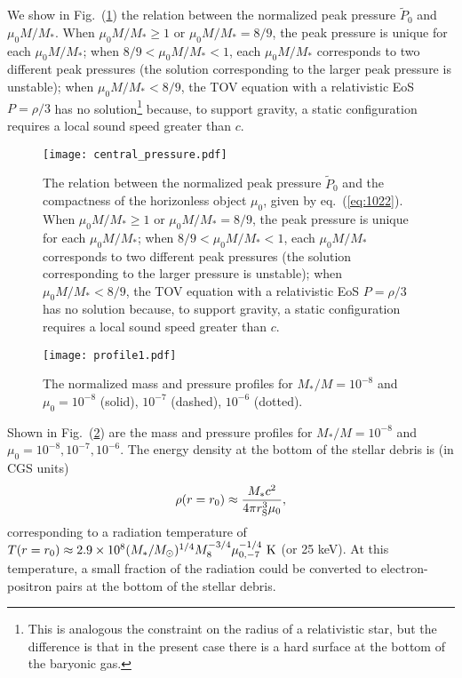 \documentclass[useAMS,usenatbib]{mn2e}
\def\tp{\widetilde{P}}
\begin{document}
We show in Fig.~(\ref{fig:p0}) the relation between the normalized
peak pressure $\tp_0$ and $\mu_0 M/M_*$. When $\mu_0 M/M_* \geq 1$
or $\mu_0 M/M_*=8/9$, the peak pressure is unique for each $\mu_0
M/M_*$; when $8/9<\mu_0 M/M_*<1$, each $\mu_0 M/M_*$
corresponds to two different peak pressures (the solution
corresponding to the larger peak pressure is unstable); when $\mu_0
M/M_*<8/9$, the TOV equation with a relativistic EoS $P = \rho/3$ has no
solution\footnote{This is analogous the \citet{Buchdahl59} constraint on the radius
  of a relativistic star, but the difference
  is that in the present case there is a hard surface at the bottom of the
  baryonic gas.} because, to support gravity, a static configuration
requires a local sound speed greater than $c$.

\begin{figure}
  \centering
\texttt{[image: central\_pressure.pdf]}
\caption{The relation between the normalized peak pressure
  $\tp_0$ and the compactness of the horizonless object $\mu_0$, given
  by eq.~(\ref{eq:1022}). When $\mu_0 M/M_* \geq 1$
or $\mu_0 M/M_*=8/9$, the peak pressure is unique for each $\mu_0
M/M_*$; when $8/9<\mu_0 M/M_*<1$, each $\mu_0 M/M_*$
corresponds to two different peak pressures (the solution
corresponding to the larger pressure is unstable); when $\mu_0
M/M_*<8/9$, the TOV equation with a relativistic EoS $P = \rho/3$ has no
solution because, to support gravity, a static configuration
requires a local sound speed greater than $c$.
}\label{fig:p0}
\end{figure}

\begin{figure}
  \centering
\texttt{[image: profile1.pdf]}
\caption{The normalized mass and pressure profiles for $M_*/M =
  10^{-8}$ and $\mu_0 = 10^{-8}$ (solid), $10^{-7}$
  (dashed), $10^{-6}$ (dotted).
}\label{fig:profile1}
\end{figure}

Shown in Fig.~(\ref{fig:profile1}) are the mass and pressure profiles
for $M_*/M = 10^{-8}$ and $\mu_0 = 10^{-8}, 10^{-7},
10^{-6}$. The energy density at the
bottom of the stellar debris is (in CGS units)
\begin{equation}
  \label{eq:12}
  \rho(r = r_0) \approx \frac{M_*c^2}{4\pi r_{\rm S}^3\mu_0},
\end{equation}
corresponding to a radiation temperature of $T(r = r_0) \approx
2.9\times10^8 (M_*/M_{\rm \odot})^{1/4} M_8^{-3/4}
\mu_{0,-7}^{-1/4}\rm\ K$ (or 25 keV). At this temperature,
a small fraction of the radiation could be converted to electron-positron
pairs at the bottom of the stellar debris.
\end{document}
